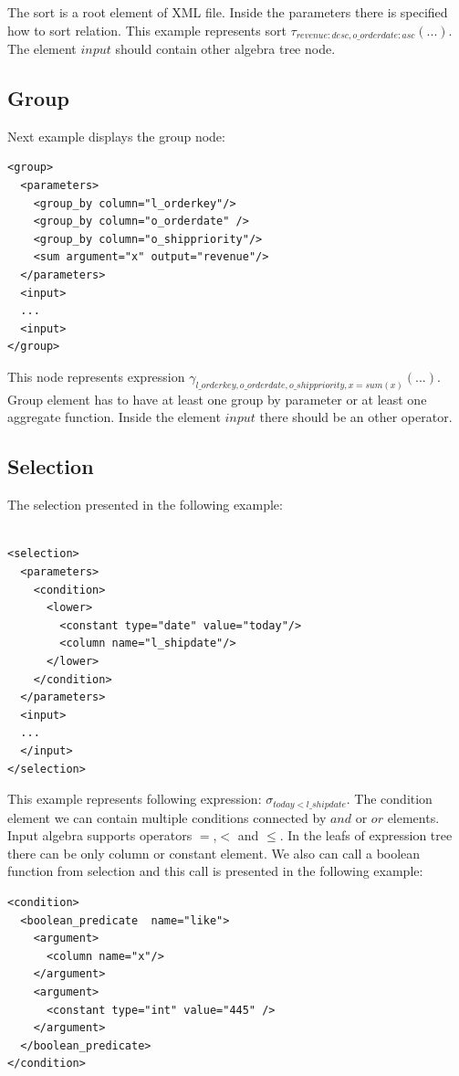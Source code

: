 The sort is a root element of XML file. Inside the parameters there is specified how to sort relation. This example represents sort $\tau_{revenue:desc,o\_orderdate:asc}(...)$. The element $input$ should contain other algebra tree node.

\subsection{Group}

Next example displays the group node:

\begin{lstlisting}
<group>
  <parameters>
    <group_by column="l_orderkey"/>
    <group_by column="o_orderdate" />
    <group_by column="o_shippriority"/>
    <sum argument="x" output="revenue"/>
  </parameters>
  <input>
  ...
  <input>
</group>
\end{lstlisting}

This node represents expression $\gamma_{l\_orderkey,o\_orderdate,o\_shippriority,x=sum(x)}(...)$. Group element has to have at least one group by parameter or at least one aggregate function. Inside the element $input$ there should be an other operator.

\subsection{Selection}

The selection presented in the following example:

\begin{lstlisting}

<selection>
  <parameters>
    <condition>
      <lower>
        <constant type="date" value="today"/>
        <column name="l_shipdate"/>
      </lower>
    </condition>
  </parameters>
  <input>
  ...
  </input>
</selection>
\end{lstlisting}
This example represents following expression: $\sigma_{today<l\_shipdate}$. The condition element we can contain multiple conditions connected by $and$ or $or$ elements. Input algebra supports operators $=$,$<$ and $\leq$. In the leafs of expression tree there can be only column or constant element. We also can call a boolean function from selection and this call is presented in the following example:

\begin{lstlisting}
<condition>
  <boolean_predicate  name="like">
    <argument>
      <column name="x"/>
    </argument>
    <argument>
      <constant type="int" value="445" />
    </argument>
  </boolean_predicate>
</condition>
\end{lstlisting}

